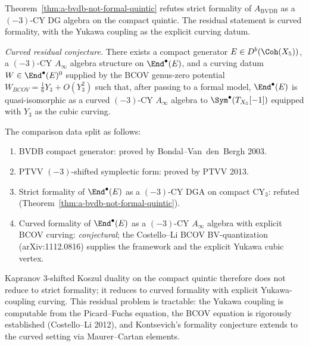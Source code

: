 \begin{remark}
\label{rem:kapranov-quintic-residual-curved}
Theorem~\ref{thm:a-bvdb-not-formal-quintic} refutes strict formality of
$A_{\mathrm{BVDB}}$ as a $(-3)$-CY DG algebra on the compact quintic. The
residual statement is curved formality, with the Yukawa coupling
as the explicit curving datum.

\textit{Curved residual conjecture.} There exists a compact
generator $E\in D^b(\Coh(X_5))$, a $(-3)$-CY $A_\infty$ algebra structure
on $\End^\bullet(E)$, and a curving datum $W \in \End^\bullet(E)^0$
supplied by the BCOV genus-zero potential
$W_{BCOV} = \tfrac{1}{6} Y_3 + O(Y_3^2)$ such that, after passing to a
formal model, $\End^\bullet(E)$ is quasi-isomorphic as a curved $(-3)$-CY
$A_\infty$ algebra to $\Sym^\bullet(T_{X_5}[-1])$ equipped with $Y_3$
as the cubic curving.

The comparison data split as follows:
\begin{enumerate}[label=\textup{(\alph*)}]
 \item BVDB compact generator: proved by Bondal--Van~den~Bergh 2003.
 \item PTVV $(-3)$-shifted symplectic form: proved by PTVV 2013.
 \item Strict formality of $\End^\bullet(E)$ as a $(-3)$-CY DGA on
 compact CY$_3$: refuted
 (Theorem~\ref{thm:a-bvdb-not-formal-quintic}).
 \item[(c$'$)] Curved formality of $\End^\bullet(E)$ as a $(-3)$-CY
 $A_\infty$ algebra with explicit BCOV curving:
 \emph{conjectural}; the Costello--Li BCOV BV-quantization
 (arXiv:1112.0816) supplies the framework and the explicit
 Yukawa cubic vertex.
\end{enumerate}
Kapranov $3$-shifted Koszul duality on the compact quintic therefore does
not reduce to strict formality; it reduces to curved formality with explicit
Yukawa-coupling curving. This residual problem is tractable: the Yukawa
coupling is computable from the Picard--Fuchs equation, the BCOV equation
is rigorously established (Costello--Li 2012), and Kontsevich's formality
conjecture extends to the curved setting via Maurer--Cartan elements.
\end{remark}

